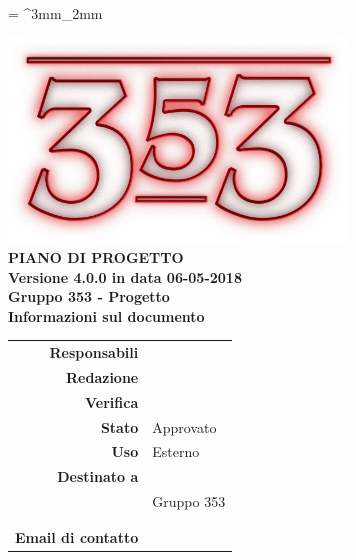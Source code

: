 \documentclass[openany, a4paper, 12pt]{report}
\begin{document}
\tabulinesep = ^3mm_2mm

\begin{titlepage}
	\centering
	\vfill
	{
		\bfseries
		\vskip2cm
		\includegraphics[width=9cm]{../../common/images/logo.png} \\
		\vfill
		\Huge{PIANO DI PROGETTO}\\
		\vfill
		\Large Versione 4.0.0 in data 06-05-2018\\
		\large Gruppo 353 - Progetto \progetto \\
		\vfill
		\normalsize Informazioni sul documento\\
		\begin{table}[htbp]
			\centering
			\renewcommand\arraystretch{1.2}
			\begin{tabular}{r|l}
				\hline
				\textbf{Responsabili}	& \Gianluca \\
				
				\textbf{Redazione} 		& \Elena \\
										
				\textbf{Verifica} 		& \Valentina \\	
				
				\textbf{Stato} 			& Approvato\\
				\textbf{Uso}			& Esterno\\
				\textbf{Destinato a}   	& \Proponente\\
										& Gruppo 353\\
										& \Vardanega\\
										& \Cardin\\
				
				\textbf{Email di contatto}	& \mailgroup
			\end{tabular}
		\end{table}
		\vfill
	}    
\end{titlepage}

\tableofcontents
\listoffigures
\listoftables
\newpage
{}






 

\end{document}
